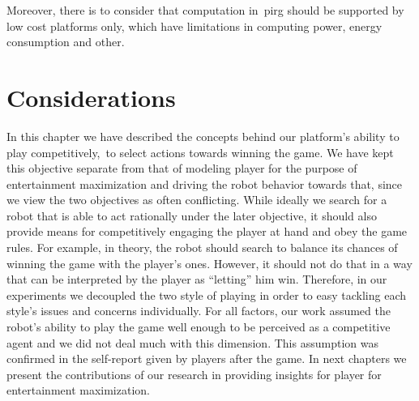 Moreover, there is to consider that computation in~\gls{pirg} should be supported by low cost platforms only, which have limitations in computing power, energy consumption and other.

\section{Considerations}
In this chapter we have described the concepts behind our platform's ability to play competitively,~\ie to select actions towards winning the game. We have kept this objective separate from that of modeling player for the purpose of entertainment maximization and driving the robot behavior towards that, since we view the two objectives as often conflicting. While ideally we search for a robot that is able to act rationally under the later objective, it should also provide means for competitively engaging the player at hand and obey the game rules. For example, in theory, the robot should search to balance its chances of winning the game with the player's ones. However, it should not do that in a way that can be interpreted by the player as ``letting'' him win. Therefore, in our experiments we decoupled the two style of playing in order to easy tackling each style's issues and concerns individually. For all factors, our work assumed the robot's ability to play the game well enough to be perceived as a competitive agent and we did not deal much with this dimension. This assumption was confirmed in the self-report given by players after the game. In next chapters we present the contributions of our research in providing insights for player for entertainment maximization.